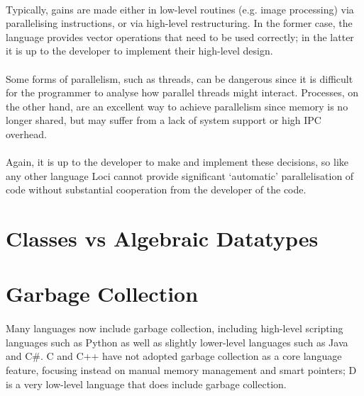 \documentclass[12pt,twoside,notitlepage]{report}
\begin{document}
\paragraph{}
Typically, gains are made either in low-level routines (e.g. image processing) via parallelising instructions, or via high-level restructuring. In the former case, the language provides vector operations that need to be used correctly; in the latter it is up to the developer to implement their high-level design.

\paragraph{}
Some forms of parallelism, such as threads, can be dangerous since it is difficult for the programmer to analyse how parallel threads might interact. Processes, on the other hand, are an excellent way to achieve parallelism since memory is no longer shared, but may suffer from a lack of system support or high IPC overhead.

\paragraph{}
Again, it is up to the developer to make and implement these decisions, so like any other language Loci cannot provide significant `automatic' parallelisation of code without substantial cooperation from the developer of the code.

\section{Classes vs Algebraic Datatypes}

\paragraph{}


\section{Garbage Collection}

\paragraph{}
Many languages now include garbage collection, including high-level scripting languages such as Python as well as slightly lower-level languages such as Java and C\#. C and C++ have not adopted garbage collection as a core language feature, focusing instead on manual memory management and smart pointers; D is a very low-level language that does include garbage collection.
\end{document}
